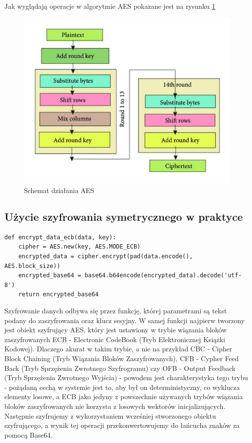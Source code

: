 \vspace{0.3\baselineskip}

Jak wyglądają operacje w algorytmie AES pokazane jest na rysunku \ref{fig:AES2}
\begin{figure}[H]
    \centering
    \includegraphics[width=\textwidth]{Images/AES2.jpg}
    \caption{Schemat działania AES}
    \label{fig:AES2}
\end{figure}

\subsection{Użycie szyfrowania symetrycznego w praktyce}

\begin{lstlisting}[caption={Szyfrowanie danych}]
def encrypt_data_ecb(data, key):
    cipher = AES.new(key, AES.MODE_ECB)
    encrypted_data = cipher.encrypt(pad(data.encode(), AES.block_size))
    encrypted_base64 = base64.b64encode(encrypted_data).decode('utf-8')
    return encrypted_base64
\end{lstlisting}
Szyfrowanie danych odbywa się przez funkcję, której parametrami są tekst podany do zaszyfrowania oraz klucz sesyjny. W samej funkcji najpierw tworzony jest obiekt szyfrujący AES, który jest ustawiony w trybie wiązania bloków zaszyfrowanych ECB - Electronic CodeBook (Tryb Elektronicznej Książki Kodowej). Dlaczego akurat w takim trybie, a nie na przykład CBC - Cipher Block Chaining (Tryb Wiązania Bloków Zaszyfrowanych), CFB - Cypher Feed Back (Tryb Sprzężenia Zwrotnego Szyfrogramu) czy OFB - Output Feedback (Tryb Sprzężenia Zwrotnego Wyjścia) - powodem jest charakterystyka tego trybu - pożądaną cechą w systemie jest to, aby był on deterministyczny, co wyklucza elementy losowe, a ECB jako jedyny z powszechnie używanych trybów wiązania bloków zaszyfrowanych nie korzysta z losowych wektorów inicjalizujących. Następnie szyfrujemy z wykorzystaniem wcześniej stworzonego obiektu szyfrującego, a wynik tej operacji przekonwertowujemy do łańcucha znaków za pomocą Base64.

